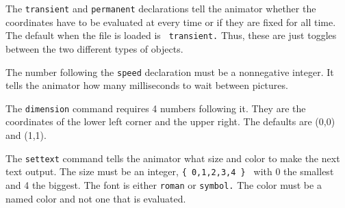 \documentclass{article}
\begin{document}
The {\tt transient} and {\tt permanent} declarations tell the animator
whether the coordinates have to be evaluated at every time or if they
are fixed for all time.  The default when the file is loaded is {\tt
transient.}  Thus, these are just toggles between the two different
types of objects. 

The number following the {\tt speed} declaration must be a nonnegative
integer. It tells the animator how many milliseconds to wait between
pictures. 

The {\tt dimension} command requires 4 numbers following it. They are
the coordinates of the lower left corner and the upper right. The
defaults are (0,0) and (1,1).  

The {\tt settext} command tells the animator what size and color to
make the next text output. The size must be an integer, {\tt \{
0,1,2,3,4 \} } with 0 the smallest and 4 the biggest. The font is
either {\tt roman} or {\tt symbol.}  The color must be a named color
and not one that is evaluated. 
\end{document}
